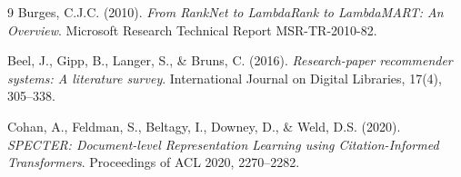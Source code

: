 \documentclass[11pt,a4paper]{article}
\begin{document}
\begin{thebibliography}{9}
Burges, C.J.C. (2010).
\textit{From RankNet to LambdaRank to LambdaMART: An Overview}.
Microsoft Research Technical Report MSR-TR-2010-82.

Beel, J., Gipp, B., Langer, S., \& Bruns, C. (2016).
\textit{Research-paper recommender systems: A literature survey}.
International Journal on Digital Libraries, 17(4), 305--338.

Cohan, A., Feldman, S., Beltagy, I., Downey, D., \& Weld, D.S. (2020).
\textit{SPECTER: Document-level Representation Learning using
Citation-Informed Transformers}.
Proceedings of ACL 2020, 2270--2282.

\end{thebibliography}
\end{document}
